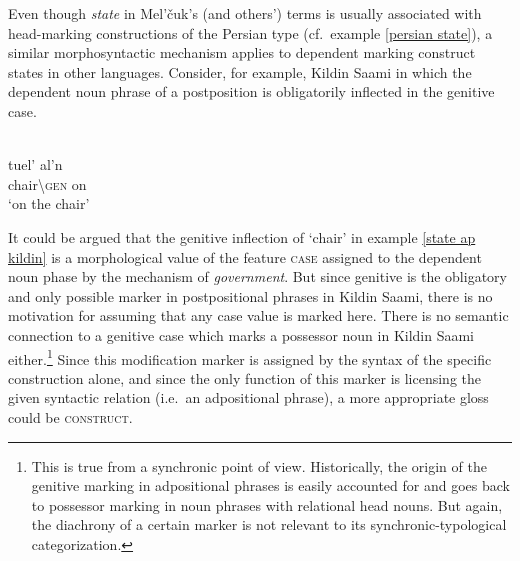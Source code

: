 Even though \emph{state} in Mel'čuk's (and others') terms is usually associated with head-marking constructions of the Persian type (cf.~example \ref{persian state}), a similar morphosyntactic mechanism applies to dependent marking construct states in other languages. Consider, for example, Kildin Saami in which the dependent noun phrase of a postposition is obligatorily inflected in the genitive case.
\begin{exe}
\ex\label{state ap kildin} 
\\
\gll 	tuel'		al'n\\
	chair\textbackslash\textsc{gen}	on\\
\glt 	‘on the chair’
\end{exe}
It could be argued that the genitive inflection of ‘chair’ in example \ref{state ap kildin} is a morphological value of the feature \textsc{case} assigned to the dependent noun phase by the mechanism of \emph{government}. But since genitive is the obligatory and only possible marker in postpositional phrases in Kildin Saami, there is no motivation for assuming that any case value is marked here. There is no semantic connection to a genitive case which marks a possessor noun in Kildin Saami either.\footnote{This is true from a synchronic point of view. Historically, the origin of the genitive marking in adpositional phrases is easily accounted for and goes back to possessor marking in noun phrases with relational head nouns. But again, the diachrony of a certain marker is not relevant to its synchronic-typological categorization.} Since this modification marker is assigned by the syntax of the specific construction alone, and since the only function of this marker is licensing the given syntactic relation (i.e.~an adpositional phrase), a more appropriate gloss could be \textsc{construct}.

